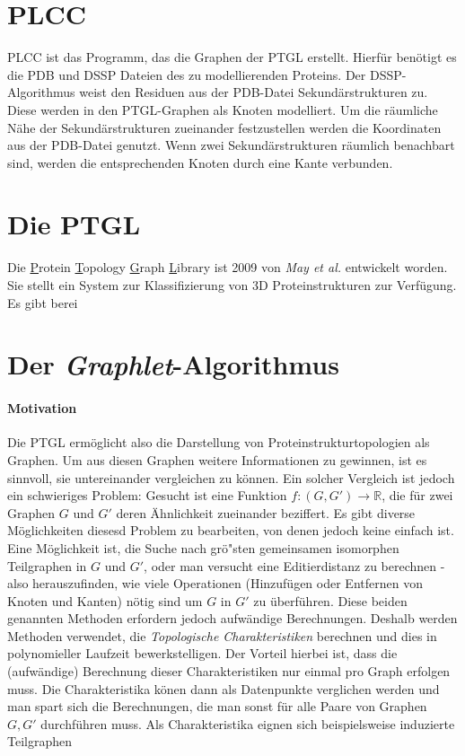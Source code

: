 \documentclass{report}
\begin{document}
\section{PLCC}

PLCC ist das Programm, das die Graphen der PTGL erstellt. Hierf\"ur ben\"otigt es die PDB und DSSP Dateien des zu modellierenden Proteins. Der DSSP-Algorithmus weist den Residuen aus der PDB-Datei Sekund\"arstrukturen zu. Diese werden in den PTGL-Graphen als Knoten modelliert. Um die r\"aumliche N\"ahe der Sekund\"arstrukturen zueinander festzustellen werden die Koordinaten aus der PDB-Datei genutzt. Wenn zwei Sekund\"arstrukturen r\"aumlich benachbart sind, werden die entsprechenden Knoten durch eine Kante verbunden.

\section{Die PTGL}


Die \underline{P}rotein \underline{T}opology \underline{G}raph \underline{L}ibrary ist 2009 von \textit{May et al.} \cite{ptgl1} entwickelt worden. Sie stellt ein System zur Klassifizierung von 3D Proteinstrukturen zur Verf\"ugung. Es gibt berei


\section{Der \textit{Graphlet}-Algorithmus}

\paragraph{Motivation}
Die PTGL \cite{vplg} erm\"oglicht also die Darstellung von Proteinstrukturtopologien als Graphen. Um aus diesen Graphen weitere Informationen zu gewinnen, ist es sinnvoll, sie untereinander vergleichen zu k\"onnen. Ein solcher Vergleich ist jedoch ein schwieriges Problem: Gesucht ist eine Funktion $f: (G,G') \rightarrow \mathbb{R} $, die f\"ur zwei Graphen $G$ und $G'$ deren \"Ahnlichkeit zueinander beziffert.
Es gibt diverse M\"oglichkeiten diesesd Problem zu bearbeiten, von denen jedoch keine einfach ist.
Eine M\"oglichkeit ist, die Suche nach gr\"o"sten gemeinsamen isomorphen Teilgraphen in $G$ und $G'$, oder man versucht eine Editierdistanz zu berechnen - also herauszufinden, wie viele Operationen (Hinzuf\"ugen oder Entfernen von Knoten und Kanten) n\"otig sind um $G$ in $G'$ zu \"uberf\"uhren. Diese beiden genannten Methoden erfordern jedoch aufw\"andige Berechnungen.
Deshalb werden Methoden verwendet, die \emph{Topologische Charakteristiken} berechnen und dies in polynomieller Laufzeit bewerkstelligen. Der Vorteil hierbei ist, dass die (aufw\"andige) Berechnung dieser Charakteristiken nur einmal pro Graph erfolgen muss. Die Charakteristika k\"onen dann als Datenpunkte verglichen werden und man spart sich die Berechnungen, die man sonst f\"ur alle Paare von Graphen $G,G'$ durchf\"uhren muss.
Als Charakteristika eignen sich beispielsweise induzierte Teilgraphen
\end{document}
